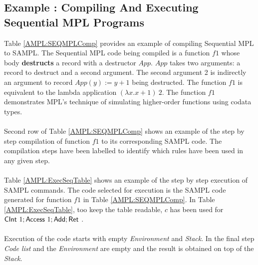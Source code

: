 \documentclass[11pt]{article}
\newcommand{\<}{\langle}
\renewcommand{\>}{\rangle}
\begin{document}
\subsection {Example : Compiling And Executing Sequential MPL Programs}
Table \ref {AMPL:SEQMPLComp} provides an example of compiling Sequential MPL to SAMPL. The Sequential MPL code being compiled is a function $f1$ whose body {\bf destructs} a {\sf record} with a {\sf destructor} $App$. $App$ takes two arguments: a {\sf record} to destruct and a second argument. The second argument 2 is indirectly an argument to {\sf record} $App(y) := y + 1$ being destructed. The function $f1$ is equivalent to the lambda application $(\lambda x.x+1)~2$. The function $f1$ demonstrates MPL's technique of simulating higher-order functions using codata types.
~~\\~~\\
Second row of Table \ref {AMPL:SEQMPLComp} shows an example of the step by step compilation of function $f1$ to its corresponding SAMPL code. The compilation steps have been labelled to identify which rules have been used in any given step.
~~\\~~\\ 
Table \ref  {AMPL:ExecSeqTable} shows an example of the step by step execution of SAMPL commands. The code selected for execution is the SAMPL code generated for function $f1$ in Table \ref {AMPL:SEQMPLComp}. In Table \ref {AMPL:ExecSeqTable}, too keep the table readable, $c$ has been used for ${\sf CInt}~1;{\sf Access}~1; {\sf Add}; {\sf Ret}$ .
~~\\~~\\
Execution of the code starts with empty {\em Environment} and {\em Stack}. In the final step {\em Code list} and the {\em Environment} are empty and the result is obtained on top of the {\em Stack}.
\end{document}
